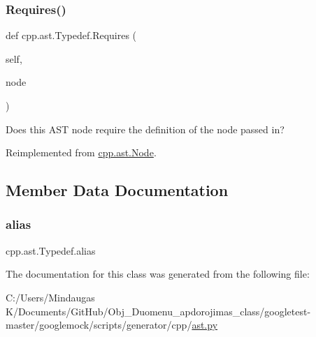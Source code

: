 \subsubsection{\texorpdfstring{Requires()}{Requires()}}
{\footnotesize\ttfamily def cpp.\+ast.\+Typedef.\+Requires (\begin{DoxyParamCaption}\item[{}]{self,  }\item[{}]{node }\end{DoxyParamCaption})}

\begin{DoxyVerb}Does this AST node require the definition of the node passed in?\end{DoxyVerb}
 

Reimplemented from \mbox{\hyperlink{classcpp_1_1ast_1_1_node_a31ae211f954a8c578ef16226df5ac8c8}{cpp.\+ast.\+Node}}.



\subsection{Member Data Documentation}
\mbox{\label{classcpp_1_1ast_1_1_typedef_a3187a504dfbefe50b866b44902823c30}} 
\subsubsection{\texorpdfstring{alias}{alias}}
{\footnotesize\ttfamily cpp.\+ast.\+Typedef.\+alias}



The documentation for this class was generated from the following file\+:\begin{DoxyCompactItemize}
\item 
C\+:/\+Users/\+Mindaugas K/\+Documents/\+Git\+Hub/\+Obj\+\_\+\+Duomenu\+\_\+apdorojimas\+\_\+class/googletest-\/master/googlemock/scripts/generator/cpp/\mbox{\hyperlink{googletest-master_2googlemock_2scripts_2generator_2cpp_2ast_8py}{ast.\+py}}\end{DoxyCompactItemize}
